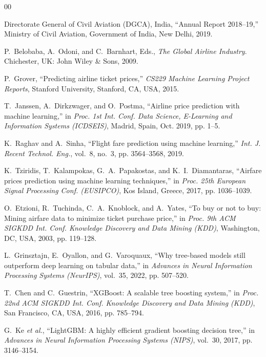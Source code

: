 \documentclass[12pt, a4paper]{article}
\begin{document}
\begin{thebibliography}{00}

Directorate General of Civil Aviation (DGCA), India,
``Annual Report 2018--19,''
Ministry of Civil Aviation, Government of India, New Delhi, 2019.

P.~Belobaba, A.~Odoni, and C.~Barnhart, Eds.,
\textit{The Global Airline Industry}.
Chichester, UK: John Wiley \& Sons, 2009.

P.~Grover,
``Predicting airline ticket prices,''
\textit{CS229 Machine Learning Project Reports},
Stanford University, Stanford, CA, USA, 2015.

T.~Janssen, A.~Dirkzwager, and O.~Postma,
``Airline price prediction with machine learning,''
in \textit{Proc. 1st Int. Conf. Data Science, E-Learning and Information
Systems (ICDSEIS)}, Madrid, Spain, Oct. 2019, pp. 1--5.

K.~Raghav and A.~Sinha,
``Flight fare prediction using machine learning,''
\textit{Int. J. Recent Technol. Eng.},
vol.~8, no.~3, pp. 3564--3568, 2019.

K.~Tziridis, T.~Kalampokas, G.~A.~Papakostas, and K.~I.~Diamantaras,
``Airfare prices prediction using machine learning techniques,''
in \textit{Proc. 25th European Signal Processing Conf. (EUSIPCO)},
Kos Island, Greece, 2017, pp. 1036--1039.

O.~Etzioni, R.~Tuchinda, C.~A.~Knoblock, and A.~Yates,
``To buy or not to buy: Mining airfare data to minimize ticket purchase
price,''
in \textit{Proc. 9th ACM SIGKDD Int. Conf. Knowledge Discovery and Data
Mining (KDD)}, Washington, DC, USA, 2003, pp. 119--128.

L.~Grinsztajn, E.~Oyallon, and G.~Varoquaux,
``Why tree-based models still outperform deep learning on tabular data,''
in \textit{Advances in Neural Information Processing Systems (NeurIPS)},
vol.~35, 2022, pp. 507--520.

T.~Chen and C.~Guestrin,
``XGBoost: A scalable tree boosting system,''
in \textit{Proc. 22nd ACM SIGKDD Int. Conf. Knowledge Discovery and Data
Mining (KDD)}, San Francisco, CA, USA, 2016, pp. 785--794.

G.~Ke \textit{et al.},
``LightGBM: A highly efficient gradient boosting decision tree,''
in \textit{Advances in Neural Information Processing Systems (NIPS)},
vol.~30, 2017, pp. 3146--3154.


\end{thebibliography}
\end{document}
